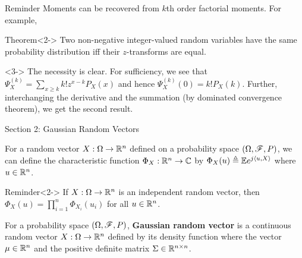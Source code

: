 \documentclass[12pt,aspectratio=169]{beamer}
\begin{document}
\begin{frame}

\begin{block}{Reminder}
Moments can be recovered from $k$th order factorial moments. 
For example, 
\end{block}
\begin{block}{Theorem}<2->
Two  non-negative integer-valued random variables have the same probability distribution iff their $z$-transforms are equal. 
\end{block}
\begin{Proof}<3->
The necessity is clear. 
For sufficiency, we see that $\Psi_X^{(k)} = \sum_{x \ge k}k!z^{x-k}P_X(x)$ and hence $\Psi_X^{(k)}(0) = k!P_X(k)$. 
Further, interchanging the derivative and the summation (by dominated convergence theorem), we get the second result. 
\end{Proof}
\end{frame}



\begin{frame}{Section 2: Gaussian Random Vectors}

\begin{Definition}
For a random vector $X: \Omega\to \mathbb{R}^n$ defined on a probability space $(\Omega,\mathscr{F},P)$, 
we can define the characteristic function $\Phi_X:\mathbb{R}^n\to\mathbb{C}$ by $\Phi_X(u) \triangleq \mathbb{E} e^{j \left\langle u,X\right\rangle}$ where $u \in \mathbb{R}^n$. 
\end{Definition}
\begin{block}{Reminder}<2->
If $X:\Omega\to\mathbb{R}^n$ is an independent random vector, 
then $\Phi_X(u) = \prod_{i=1}^n\Phi_{X_i}(u_i)$ for all $u \in \mathbb{R}^n$.
\end{block}
\end{frame}

\begin{frame}
\begin{Definition} 
For a probability space $(\Omega, \mathscr{F}, P)$, 
\textbf{Gaussian random vector} is a continuous random vector $X: \Omega \to \mathbb{R}^n$ defined by its density function
where the vector $\mu \in \mathbb{R}^n$ and the positive definite matrix $\Sigma \in \mathbb{R}^{n \times n}$. 
\end{Definition}
\end{frame}
\end{document}
